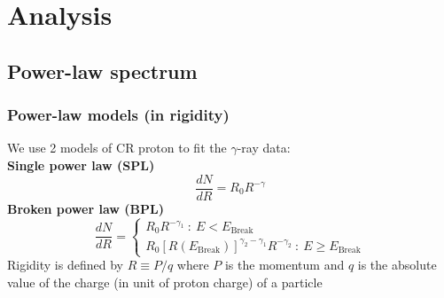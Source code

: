 \documentclass{beamer}
\begin{document}
\section{Analysis}

\subsection{Power-law spectrum}
\begin{frame}
  \frametitle{Power-law models (in rigidity)}
  We use 2 models of CR proton to fit the $\gamma$-ray data: \\
  \textbf{Single power law (SPL)}
  \begin{equation}
  \frac{dN}{dR} = R_0R^{-\gamma}
  \end{equation}
  \textbf{Broken power law (BPL)}
  \begin{equation}
  \frac{dN}{dR}=
    \begin{cases}
      R_0R^{-\gamma_1}\ :\ E < E_{\text{Break}}\\
      R_0[R(E_{\text{Break}})]^{\gamma_2-\gamma_1}R^{-\gamma_2}\ :\ E \ge E_{\text{Break}}
    \end{cases}
  \end{equation}
  Rigidity is defined by $R\equiv P/q$ where $P$ is the momentum and $q$ is the absolute value of the charge (in unit of proton charge) of a particle
  \end{frame}
\end{document}
